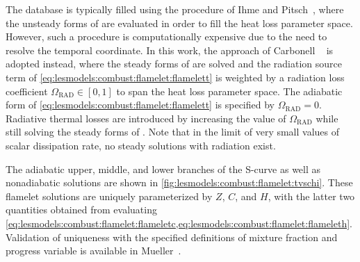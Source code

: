 The database is typically filled using the procedure of Ihme and Pitsch~\cite{ihme2008}, where the unsteady forms of  are evaluated in order to fill the heat loss parameter space. However, such a procedure is computationally expensive due to the need to resolve the temporal coordinate. In this work, the approach of Carbonell \etal~\cite{carbonell2009} is adopted instead, where the steady forms of  are solved and the radiation source term of \cref{eq:lesmodels:combust:flamelet:flamelett} is weighted by a radiation loss coefficient $\Omega_{\text{RAD}} \in [0,1]$ to span the heat loss parameter space. The adiabatic form of \cref{eq:lesmodels:combust:flamelet:flamelett} is specified by $\Omega_{\text{RAD}} = 0$. Radiative thermal losses are introduced by increasing the value of $\Omega_{\text{RAD}}$ while still solving the steady forms of . Note that in the limit of very small values of scalar dissipation rate, no steady solutions with radiation exist.

The adiabatic upper, middle, and lower branches of the S-curve as well as nonadiabatic solutions are shown in \cref{fig:lesmodels:combust:flamelet:tvschi}. These flamelet solutions are uniquely parameterized by $Z$, $C$, and $H$, with the latter two quantities obtained from evaluating \cref{eq:lesmodels:combust:flamelet:flameletc,eq:lesmodels:combust:flamelet:flameleth}. Validation of uniqueness with the specified definitions of mixture fraction and progress variable is available in Mueller~\cite{muellerphd}.


